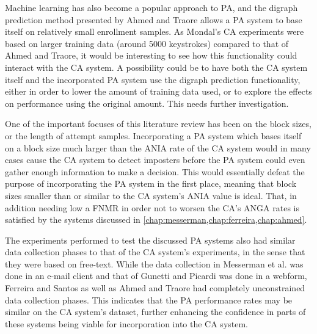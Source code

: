 \documentclass[informationsecurity]{gucmasterproject}
\begin{document}
Machine learning has also become a popular approach to PA, and the digraph prediction method presented by Ahmed and Traore \cite{Ahmed} allows a PA system to base itself on relatively small enrollment samples.
As Mondal's \cite{mondal} CA experiments were based on larger training data (around 5000 keystrokes) compared to that of Ahmed and Traore, it would be interesting to see how this functionality could interact with the CA system.
A possibility could be to have both the CA system itself and the incorporated PA system use the digraph prediction functionality, either in order to lower the amount of training data used, or to explore the effects on performance using the original amount. 
This needs further investigation.

One of the important focuses of this literature review has been on the block sizes, or the length of attempt samples.
Incorporating a PA system which bases itself on a block size much larger than the ANIA rate of the CA system would in many cases cause the CA system to detect imposters before the PA system could even gather enough information to make a decision.
This would essentially defeat the purpose of incorporating the PA system in the first place, meaning that block sizes smaller than or similar to the CA system's ANIA value is ideal.
That, in addition needing low a FNMR in order not to worsen the CA's ANGA rates is satisfied by the systems discussed in \cref{chap:messerman,chap:ferreira,chap:ahmed}.

The experiments performed to test the discussed PA systems also had similar data collection phases to that of the CA system's experiments, in the sense that they were based on free-text.
While the data collection in Messerman et al. \cite{Messerman} was done in an e-mail client and that of Gunetti and Picardi \cite{gnp} was done in a webform, Ferreira and Santos \cite{superResults} as well as Ahmed and Traore \cite{Ahmed} had completely unconstrained data collection phases.
This indicates that the PA performance rates may be similar on the CA system's dataset, further enhancing the confidence in parts of these systems being viable for incorporation into the CA system.
\end{document}
